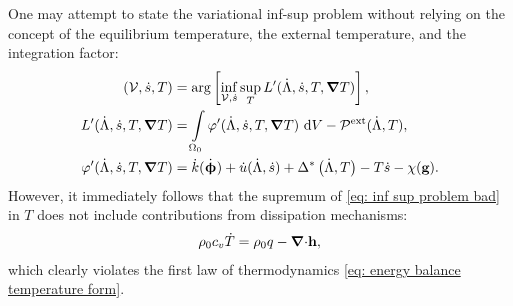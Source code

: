\begin{remark}
  One may attempt to state the variational inf-sup problem without relying on the concept of the equilibrium temperature, the external temperature, and the integration factor:
  \begin{subequations}
    \begin{align}
      \left( \mathcal{V}, \dot{s}, T \right)       & = \arg \left[ \inf_{\mathcal{V}, \dot{s}} \sup_T L'(\dot{\Lambda}, \dot{s}, T, \boldsymbol{\nabla} T) \right], \label{eq: inf sup problem bad} \\
      L'(\dot{\Lambda}, \dot{s}, T, \boldsymbol{\nabla} T)       & = \int\limits_{\Omega_0} \varphi'(\dot{\Lambda}, \dot{s}, T, \boldsymbol{\nabla} T) \text{ d}V - \mathcal{P}^\text{ext}(\dot{\Lambda}, T),        \\
      \varphi'(\dot{\Lambda}, \dot{s}, T, \boldsymbol{\nabla} T) & = \dot{k}(\dot{\boldsymbol{\upphi}}) + \dot{u}(\dot{\Lambda}, \dot{s}) + \Delta^*\left( \dot{\Lambda}, T \right) - T\dot{s} - \chi(\textbf{g}).         
    \end{align}
  \end{subequations}
  However, it immediately follows that the supremum of \eqref{eq: inf sup problem bad} in $T$ does not include contributions from dissipation mechanisms:
  \begin{align}
    \rho_0 c_v \dot{T} = \rho_0 q - {\boldsymbol{\nabla} \cdot} \textbf{h},
  \end{align}
  which clearly violates the first law of thermodynamics \eqref{eq: energy balance temperature form}.
\end{remark}

